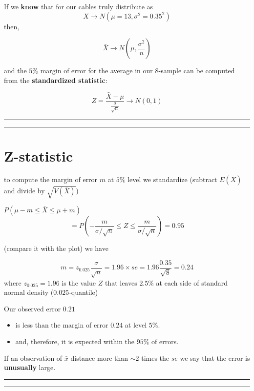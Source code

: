 \documentclass[
]{book}
\begin{document}
If we \textbf{know} that for our cables truly distribute as
\[X \rightarrow N(\mu=13, \sigma^2=0.35^2)\] then,

\[\bar{X} \rightarrow N(\mu, \frac{\sigma^2}{n})\]

and the \(5\%\) margin of error for the average in our \(8\)-sample can be computed from the \textbf{standardized statistic}:

\[Z=\frac{\bar{X}-\mu}{\frac{\sigma}{\sqrt{n}}}  \rightarrow N(0,1)\]

\begin{center}\rule{0.5\linewidth}{0.5pt}\end{center}

\begin{center}\rule{0.5\linewidth}{0.5pt}\end{center}

\hypertarget{z-statistic-1}{%
\section{Z-statistic}\label{z-statistic-1}}

to compute the margin of error \(m\) at \(5\%\) level we standardize (subtract \(E(\bar{X})\) and divide by \(\sqrt{V(\bar{X})}\))

\(P(\mu-m \leq \bar{X} \leq\mu + m)\)
\[=P(-\frac{m}{\sigma/\sqrt{n}} \leq Z \leq\frac{m}{\sigma/\sqrt{n}})=0.95\]

(compare it with the plot) we have

\[m=z_{0.025} \frac{\sigma}{\sqrt{n}}=1.96\times se=1.96\frac{0.35}{\sqrt{8}}=0.24\]
where \(z_{0.025}=1.96\) is the value \(Z\) that leaves \(2.5\%\) at each side of standard normal density (\(0.025\)-quantile)

Our observed error \(0.21\)

\begin{itemize}
\item
  is less than the margin of error \(0.24\) at level \(5\%\).
\item
  and, therefore, it is expected within the \(95\%\) of errors.
\end{itemize}

If an observation of \(\bar{x}\) distance more than \(\sim 2\) times the \(se\) we say that the error is \textbf{unusually} large.

\begin{center}\rule{0.5\linewidth}{0.5pt}\end{center}

\begin{center}\rule{0.5\linewidth}{0.5pt}\end{center}
\end{document}
